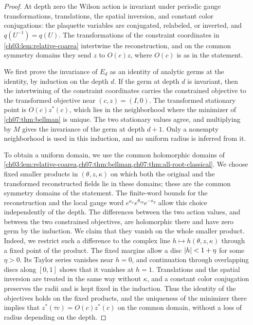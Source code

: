 \begin{proof}
At depth zero the Wilson action is invariant under periodic gauge transformations, translations, the spatial inversion, and constant color conjugations: the plaquette variables are conjugated, relabeled, or inverted, and $q(U^{-1})=q(U)$. The transformations of the constraint coordinates in \cref{ch03:lem:relative-coarea} intertwine the reconstruction, and on the common symmetry domains they send $z$ to $O(c)z$, where $O(c)$ is as in the statement.

We first prove the invariance of $E_d$ as an identity of analytic germs at the identity, by induction on the depth $d$. If the germ at depth $d$ is invariant, then the intertwining of the constraint coordinates carries the constrained objective to the transformed objective near $(c,z)=(I,0)$. The transformed stationary point is $O(c)z^*(c)$, which lies in the neighborhood where the minimizer of \cref{ch07:thm:bellman} is unique. The two stationary values agree, and multiplying by $M$ gives the invariance of the germ at depth $d+1$. Only a nonempty neighborhood is used in this induction, and no uniform radius is inferred from it.

To obtain a uniform domain, we use the common holomorphic domains of \cref{ch03:lem:relative-coarea,ch07:thm:bellman,ch07:thm:all-root-classical}. We choose fixed smaller products in $(\theta,z,\kappa)$ on which both the original and the transformed reconstructed fields lie in these domains; these are the common symmetry domains of the statement. The finite-word bounds for the reconstruction and the local gauge word $e^{\kappa_x}e^{\theta_{xy}}e^{-\kappa_y}$ allow this choice independently of the depth. The differences between the two action values, and between the two constrained objectives, are holomorphic there and have zero germ by the induction. We claim that they vanish on the whole smaller product. Indeed, we restrict such a difference to the complex line $h\mapsto h(\theta,z,\kappa)$ through a fixed point of the product. The fixed margins allow a disc $\lvert h\rvert<1+\eta$ for some $\eta>0$. Its Taylor series vanishes near $h=0$, and continuation through overlapping discs along $[0,1]$ shows that it vanishes at $h=1$. Translations and the spatial inversion are treated in the same way without $\kappa$, and a constant color conjugation preserves the radii and is kept fixed in the induction. Thus the identity of the objectives holds on the fixed products, and the uniqueness of the minimizer there implies that $z^*(\tau c)=O(c)z^*(c)$ on the common domain, without a loss of radius depending on the depth.


\end{proof}
